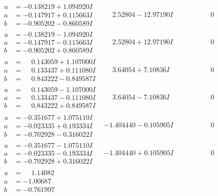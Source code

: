 \documentclass[1p]{elsarticle_modified}
\theoremstyle{definition}
\begin{document}
$$\begin{array}{c|c|c}
\begin{aligned}
u &= -0.138219 + 1.094920 I \\
a &= -0.147917 + 0.115663 I \\
b &= -0.905202 - 0.860589 I\end{aligned}
 & \phantom{-}2.52804 - 12.97190 I & \phantom{-0.000000 } 0 \\ \hline\begin{aligned}
u &= -0.138219 - 1.094920 I \\
a &= -0.147917 - 0.115663 I \\
b &= -0.905202 + 0.860589 I\end{aligned}
 & \phantom{-}2.52804 + 12.97190 I & \phantom{-0.000000 } 0 \\ \hline\begin{aligned}
u &= \phantom{-}0.143059 + 1.107000 I \\
a &= \phantom{-}0.133437 + 0.111080 I \\
b &= \phantom{-}0.843222 - 0.849587 I\end{aligned}
 & \phantom{-}3.64054 + 7.10836 I & \phantom{-0.000000 } 0 \\ \hline\begin{aligned}
u &= \phantom{-}0.143059 - 1.107000 I \\
a &= \phantom{-}0.133437 - 0.111080 I \\
b &= \phantom{-}0.843222 + 0.849587 I\end{aligned}
 & \phantom{-}3.64054 - 7.10836 I & \phantom{-0.000000 } 0 \\ \hline\begin{aligned}
u &= -0.351677 + 1.075110 I \\
a &= -0.023335 + 0.193334 I \\
b &= -0.702928 - 0.316022 I\end{aligned}
 & -1.404440 - 0.105905 I & \phantom{-0.000000 } 0 \\ \hline\begin{aligned}
u &= -0.351677 - 1.075110 I \\
a &= -0.023335 - 0.193334 I \\
b &= -0.702928 + 0.316022 I\end{aligned}
 & -1.404440 + 0.105905 I & \phantom{-0.000000 } 0 \\ \hline\begin{aligned}
u &= \phantom{-}1.14082\phantom{ +0.000000I} \\
a &= -1.00687\phantom{ +0.000000I} \\
b &= -0.761997\phantom{ +0.000000I}\end{aligned}

\end{array}$$
\end{document}
